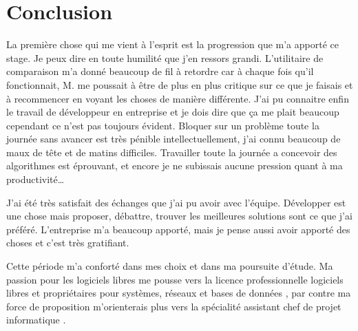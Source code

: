 \chapter{Conclusion}

La première chose qui me vient à l'esprit est la progression que m'a apporté ce
stage. Je peux dire en toute humilité que j'en ressors grandi. L'utilitaire de
comparaison m'a donné beaucoup de fil à retordre car à chaque fois qu'il
fonctionnait, M. me poussait à être de plus en plus critique sur
ce que je faisais et à recommencer en voyant les choses de manière différente.
J'ai pu connaitre enfin le travail de développeur en entreprise et je dois dire
que ça me plait beaucoup cependant ce n'est pas toujours évident. Bloquer sur
un problème toute la journée sans avancer est très pénible intellectuellement,
j'ai connu beaucoup de maux de tête et de matins difficiles. Travailler toute
la journée a concevoir des algorithmes est éprouvant, et encore je ne subissais
aucune pression quant à ma productivité\dots

J'ai été très satisfait des échanges que j'ai pu avoir avec l'équipe.
Développer est une chose mais proposer, débattre, trouver les meilleures
solutions sont ce que j'ai préféré. L'entreprise m'a beaucoup apporté, mais je
pense aussi avoir apporté des choses et c'est très gratifiant.

Cette période m'a conforté dans mes choix et dans ma poursuite d'étude. Ma
passion pour les logiciels libres me pousse vers la licence professionnelle \og
logiciels libres et propriétaires pour systèmes, réseaux et bases de données
\fg{}, par contre ma force de proposition m'orienterais plus vers la \og
spécialité assistant chef de projet informatique \fg{}.

